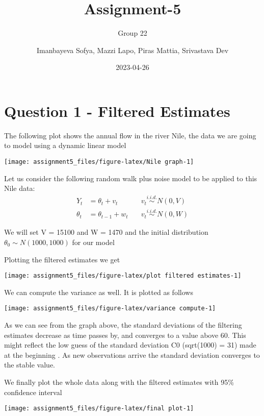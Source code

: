 \documentclass[
]{article}
\title{Assignment-5 \vspace{1in}}
\subtitle{Group 22 \vspace{1in}}
\author{Imanbayeva Sofya, Mazzi Lapo, Piras Mattia, Srivastava Dev
\vspace{1in}}
\date{2023-04-26 \vspace{1in}}
\begin{document}
\maketitle

\newpage

\hypertarget{question-1---filtered-estimates}{%
\section{Question 1 - Filtered
Estimates}\label{question-1---filtered-estimates}}

The following plot shows the annual flow in the river Nile, the data we
are going to model using a dynamic linear model

\texttt{[image: assignment5\_files/figure-latex/Nile graph-1]}

Let us consider the following random walk plus noise model to be applied
to this Nile data: \begin{eqnarray*} 
Y_t &= \theta_t + v_t \quad    & v_t \overset{i.i.d.}\sim N(0, V)\\
\theta_t &= \theta_{t-1} + w_t \quad   & v_t \overset{i.i.d.}\sim N(0, W)
\end{eqnarray*}

We will set V = 15100 and W = 1470 and the initial distribution
\(\theta_0 \sim N(1000,1000)\) for our model

Plotting the filtered estimates we get

\texttt{[image: assignment5\_files/figure-latex/plot filtered estimates-1]}

We can compute the variance as well. It is plotted as follows

\texttt{[image: assignment5\_files/figure-latex/variance compute-1]}

As we can see from the graph above, the standard deviations of the
filtering estimates decrease as time passes by, and converges to a value
above 60. This might reflect the low guess of the standard deviation C0
(sqrt(1000) = 31) made at the beginning . As new observations arrive the
standard deviation converges to the stable value.

We finally plot the whole data along with the filtered estimates with
95\% confidence interval

\texttt{[image: assignment5\_files/figure-latex/final plot-1]}
\end{document}
